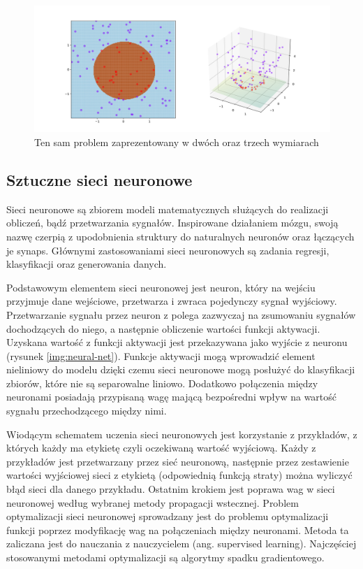 \documentclass[a4paper, twoside, 11pt, openright]{article}
\begin{document}
\begin{figure}[H]
\centering \includegraphics[scale=0.2]{img/svm2.png}
\caption{Ten sam problem zaprezentowany w dwóch oraz trzech wymiarach \cite{wikisvm}}
\label{img:wiki_svm2}
\end{figure}


\subsection{Sztuczne sieci neuronowe}

Sieci neuronowe \cite{neural-nets} są zbiorem modeli matematycznych służących do realizacji obliczeń, bądź przetwarzania sygnałów. Inspirowane działaniem mózgu, swoją nazwę czerpią z upodobnienia struktury do naturalnych neuronów oraz łączących je synaps. Głównymi zastosowaniami sieci neuronowych są zadania regresji, klasyfikacji oraz generowania danych. 

\bigskip

Podstawowym elementem sieci neuronowej jest neuron, który na wejściu przyjmuje dane wejściowe, przetwarza i zwraca pojedynczy sygnał wyjściowy. Przetwarzanie sygnału przez neuron z polega zazwyczaj na zsumowaniu sygnałów dochodzących do niego, a następnie obliczenie wartości funkcji aktywacji. Uzyskana wartość z funkcji aktywacji jest przekazywana jako wyjście z neuronu (rysunek \ref{img:neural-net}). Funkcje aktywacji mogą wprowadzić element nieliniowy do modelu dzięki czemu sieci neuronowe mogą posłużyć do klasyfikacji zbiorów, które nie są separowalne liniowo. Dodatkowo połączenia między neuronami posiadają przypisaną wagę mającą bezpośredni wpływ na wartość sygnału przechodzącego między nimi.

\bigskip

Wiodącym schematem uczenia sieci neuronowych jest korzystanie z przykładów, z których każdy ma etykietę czyli oczekiwaną wartość wyjściową. Każdy z przykładów jest przetwarzany przez sieć neuronową, następnie przez zestawienie wartości wyjściowej sieci z etykietą (odpowiednią funkcją straty) można wyliczyć błąd sieci dla danego przykładu. Ostatnim krokiem jest poprawa wag w sieci neuronowej według wybranej metody propagacji wstecznej. Problem optymalizacji sieci neuronowej sprowadzany jest do problemu optymalizacji funkcji poprzez modyfikację wag na połączeniach między neuronami. Metoda ta zaliczana jest do nauczania z nauczycielem (ang. supervised learning). Najczęściej stosowanymi metodami optymalizacji są algorytmy spadku gradientowego. 
\end{document}
